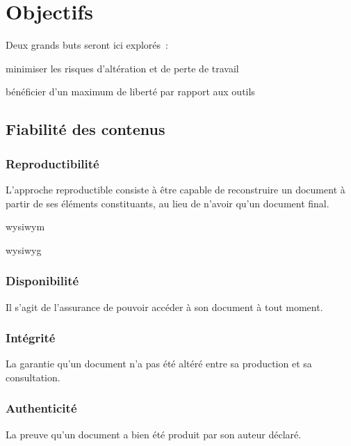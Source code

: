\section{Objectifs}

Deux grands buts seront ici explorés :
\begin{itmz}
\item{minimiser les risques d’altération et de perte de travail}
\item{bénéficier d’un maximum de liberté par rapport aux outils}
\end{itmz}
\subsection{Fiabilité des contenus}

\subsubsection{Reproductibilité}

L’approche reproductible consiste à être capable de reconstruire un document
à partir de ses éléments constituants, au lieu de n’avoir qu’un document final.

\begin{itmz}
\item{\gls{wysiwym} \cite{wysiwym}}
\item{\gls{wysiwyg} \cite{wysiwyg}}
\end{itmz}

\subsubsection{Disponibilité}

Il s’agit de l’assurance de pouvoir accéder à son document à tout moment.

\subsubsection{Intégrité}

La garantie qu’un document n’a pas été altéré
entre sa production et sa consultation.

\subsubsection{Authenticité}

La preuve qu’un document a bien été produit par son auteur déclaré.
